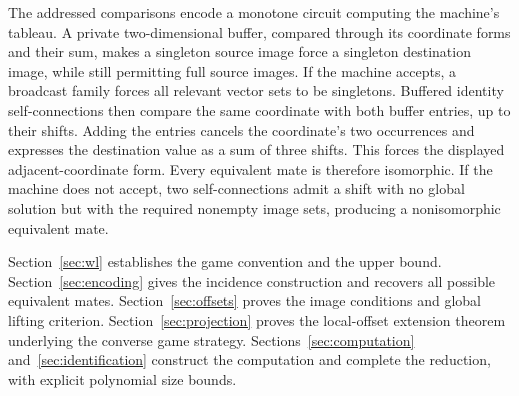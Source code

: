 The addressed comparisons encode a monotone circuit computing the
machine's tableau. A private two-dimensional buffer, compared through
its coordinate forms and their sum, makes a singleton source
image force a singleton destination image, while still permitting
full source images. If the machine accepts, a broadcast family forces
all relevant vector sets to be singletons. Buffered identity
self-connections then compare the same coordinate with both buffer
entries, up to their shifts. Adding the entries cancels the coordinate's
two occurrences and expresses the destination
value as a sum of three shifts. This forces the displayed
adjacent-coordinate form.
Every equivalent mate is therefore isomorphic. If the machine does
not accept, two self-connections admit a shift with no global solution
but with the required nonempty image sets, producing a nonisomorphic
equivalent mate.

Section~\ref{sec:wl} establishes the game convention and the upper
bound. Section~\ref{sec:encoding} gives the incidence construction
and recovers all possible equivalent mates.
Section~\ref{sec:offsets} proves the image conditions and global
lifting criterion. Section~\ref{sec:projection} proves the
local-offset extension theorem underlying the converse game strategy.
Sections~\ref{sec:computation} and~\ref{sec:identification} construct
the computation and complete the reduction, with explicit polynomial
size bounds.
